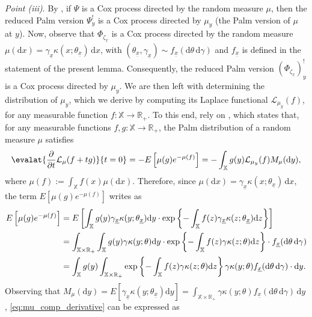 \documentclass[11pt,a4paper,oneside]{article}
\newcommand{\dd}{\mathrm d}
\newcommand{\E}{E}
\newcommand{\X}{\mathbb{X}}
\newcommand{\R}{\mathbb{R}}
\theoremstyle{definition}
\theoremstyle{remark}
\begin{document}
\emph{Point (iii)}. By \cite[Proposition 3.2.5]{BaBlaKa}, if $\Psi$ is a Cox process directed by the random measure $\mu$, then the reduced Palm version $\Psi^!_y$ is a Cox process directed by $\mu_y$ (the Palm version of $\mu$ at $y$). Now, observe that $\Phi_{\zeta_{\underline{x}}}$ is a Cox process directed by the random measure $\mu(\dd x ) = \gamma_{{\underline{x}}} \kappa(x; \theta_{{\underline{x}}}) \,\dd x $, with $ (\theta_{{\underline{x}}}, \gamma_{{\underline{x}}}) \sim f_{{\underline{x}}}(\dd \theta \,\dd \gamma)$ and $f_{{\underline{x}}}$ is defined in the statement of the present lemma. Consequently, the reduced Palm version $ \left( \Phi_{\zeta_{{\underline{x}}}} \right)^!_{y}$ is a Cox process directed by $\mu_y$. We are then left with determining the distribution of $\mu_y$, which we derive by computing its Laplace functional $\mathcal{L}_{\mu_y}(f)$, for any measurable function $f: \X \to \R_+$. To this end, rely on \cite[Proposition 3.2.1]{BaBlaKa}, which states that, for any measurable functions $f, g: \X \to \R_+$, the Palm distribution of a random measure $\mu$ satisfies
    \begin{equation}\label{eq:bacelli_palm_laplace}
        \evalat{\frac{\partial}{\partial t} \mathcal{L}_{\mu}(f + tg)}{t=0} =  - \E\left[ \mu(g) e^{-\mu(f)} \right] = - \int_{\X} g(y) \mathcal{L}_{\mu_y}(f) M_{\mu}(\dd y),
    \end{equation}
where $\mu(f):= \int_{\X} f(x) \mu(\dd x)$. Therefore, since $\mu(\dd x ) = \gamma_{{\underline{x}}} \kappa(x; \theta_{{\underline{x}}}) \,\dd x $, the term $\E\left[ \mu(g) e^{-\mu(f)} \right]$ writes as
    \begin{align}
        \E\left[ \mu(g) e^{-\mu(f)} \right] &= \E\left[ \int_{\X} g(y) \gamma_{\underline{x}} \kappa(y; \theta_{\underline{x}}) \dd y  \cdot \exp\left\{ - \int_{\X} f(z) \gamma_{\underline{x}} \kappa(z; \theta_{\underline{x}}) \dd z  \right\} \right]\notag \\
        &=  \int_{\X\times \R_+} \int_{\X} g(y) \gamma \kappa(y; \theta) \dd y  \cdot \exp\left\{ - \int_{\X} f(z) \gamma \kappa(z; \theta) \dd z  \right\} \cdot f_{\underline{x}}(\dd\theta \, \dd \gamma)\notag \\
        &= \int_{\X} g(y)  \int_{\X\times \R_+}  \exp\left\{ - \int_{\X} f(z) \gamma \kappa(z; \theta) \dd z  \right\} \gamma \kappa(y; \theta)  f_{\underline{x}}(\dd\theta \, \dd \gamma) \cdot  \dd y.\label{eq:mu_comp_derivative}
    \end{align}
Observing that $M_\mu(\dd y) = \E[\gamma_{\underline{x}} \kappa(y; \theta_{\underline{x}}) \dd y ] = \int_{\X\times \R_+} \gamma \kappa(y; \theta) f_{\underline{x}}(\dd\theta\, \dd \gamma)\, \dd y$,  \eqref{eq:mu_comp_derivative} can be expressed as
\end{document}
